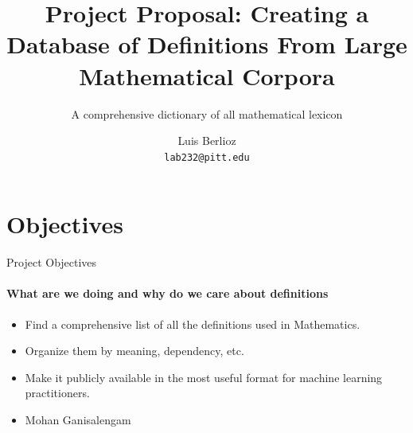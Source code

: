 \documentclass{beamer}
\title{Project Proposal: Creating a Database of Definitions From Large Mathematical Corpora}
\subtitle{A comprehensive dictionary of all mathematical lexicon}
\author{Luis Berlioz\\
\texttt{lab232@pitt.edu}}
\institute{University of Pittsburgh}
\begin{document}
\begin{frame}
\titlepage
\end{frame}
\section{Objectives}
\begin{frame}{Project Objectives}
    \framesubtitle{What are we doing and why do we care about definitions}
\begin{itemize}
\item Find a comprehensive list of all the definitions used in Mathematics.
\item Organize them by meaning, dependency, etc.
\item Make it publicly available in the most useful format for machine learning practitioners.
\item {} Mohan Ganisalengam
\end{itemize}
\end{frame}
\end{document}
